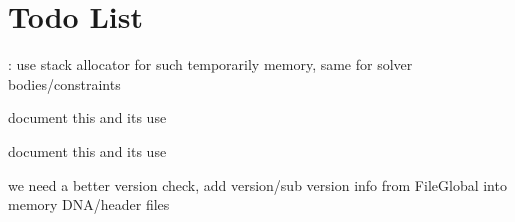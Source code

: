 \chapter{Todo List}
\hypertarget{todo}{}\label{todo}

\begin{DoxyRefList}
\item[Member \doxylink{classb3_pgs_jacobi_solver_a77bbf900d267d24d3cf8363f9b690736}{b3\+Pgs\+Jacobi\+Solver\+::solve\+Group\+Cache\+Friendly\+Setup} (\doxylink{structb3_rigid_body_data}{b3\+Rigid\+Body\+Data} \texorpdfstring{$\ast$}{*}bodies, \doxylink{structb3_inertia_data}{b3\+Inertia\+Data} \texorpdfstring{$\ast$}{*}inertias, int num\+Bodies, b3\+Contact4 \texorpdfstring{$\ast$}{*}manifold\+Ptr, int num\+Manifolds, b3\+Typed\+Constraint \texorpdfstring{$\ast$}{*}\texorpdfstring{$\ast$}{*}constraints, int num\+Constraints, const \doxylink{structb3_contact_solver_info}{b3\+Contact\+Solver\+Info} \&info\+Global)]\label{todo__todo000005}%
%
\+: use stack allocator for such temporarily memory, same for solver bodies/constraints  
\item[Member \doxylink{classb3_quaternion_aa7fad2b19aeceda85a232ec98f3f49fc}{b3\+Quaternion\+::farthest} (const \doxylink{classb3_quaternion}{b3\+Quaternion} \&qd) const]\label{todo__todo000002}%
%
document this and it\textquotesingle{}s use  
\item[Member \doxylink{classb3_quaternion_a1d6d1a80f6ef65a132c1b3f7ad926b29}{b3\+Quaternion\+::nearest} (const \doxylink{classb3_quaternion}{b3\+Quaternion} \&qd) const]\label{todo__todo000003}%
%
document this and it\textquotesingle{}s use  
\item[Member \doxylink{classb_parse_1_1b_file_a2a8cb9d151dfa612f0eb86a705f4bb5d}{b\+Parse\+::b\+File\+::parse\+Internal} (int verbose\+Mode, char \texorpdfstring{$\ast$}{*}mem\+Dna, int mem\+Dna\+Length)]\label{todo__todo000007}%
%
we need a better version check, add version/sub version info from File\+Global into memory DNA/header files  
\item[Member \doxylink{classbt_axis_sweep3_internal_a4e26f4f8acf63f26451f6396223001bb}{bt\+Axis\+Sweep3\+Internal\texorpdfstring{$<$}{<} BP\+\_\+\+FP\+\_\+\+INT\+\_\+\+TYPE \texorpdfstring{$>$}{>}\+::remove\+Handle} (BP\+\_\+\+FP\+\_\+\+INT\+\_\+\+TYPE handle, \doxylink{classbt_dispatcher}{bt\+Dispatcher} \texorpdfstring{$\ast$}{*}dispatcher)]\label{todo__todo000008}%

\end{DoxyRefList}
